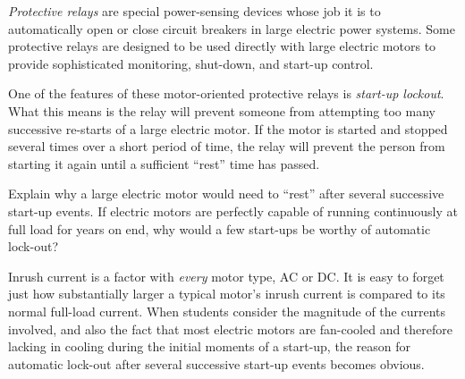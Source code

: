 

{\it Protective relays} are special power-sensing devices whose job it is to automatically open or close circuit breakers in large electric power systems.  Some protective relays are designed to be used directly with large electric motors to provide sophisticated monitoring, shut-down, and start-up control.

One of the features of these motor-oriented protective relays is {\it start-up lockout}.  What this means is the relay will prevent someone from attempting too many successive re-starts of a large electric motor.  If the motor is started and stopped several times over a short period of time, the relay will prevent the person from starting it again until a sufficient ``rest'' time has passed.

Explain why a large electric motor would need to ``rest'' after several successive start-up events.  If electric motors are perfectly capable of running continuously at full load for years on end, why would a few start-ups be worthy of automatic lock-out?







Inrush current is a factor with {\it every} motor type, AC or DC.  It is easy to forget just how substantially larger a typical motor's inrush current is compared to its normal full-load current.  When students consider the magnitude of the currents involved, and also the fact that most electric motors are fan-cooled and therefore lacking in cooling during the initial moments of a start-up, the reason for automatic lock-out after several successive start-up events becomes obvious.












